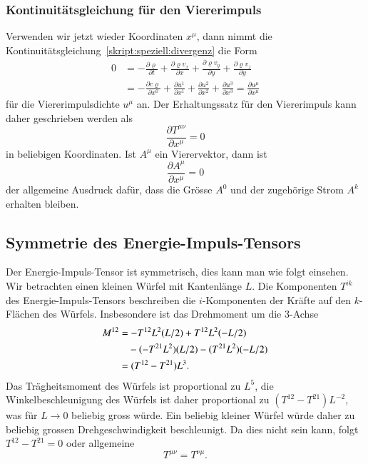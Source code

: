 \subsubsection{Kontinuitätsgleichung für den Viererimpuls}
Verwenden wir jetzt wieder Koordinaten $x^\mu$, dann nimmt die
Kontinuitätsgleichung~\eqref{skript:speziell:divergenz}
die Form
\begin{align*}
0
&=
-
\frac{\partial \varrho}{\partial t}
+
\frac{\partial \varrho v_x}{\partial x}
+
\frac{\partial \varrho v_y}{\partial y}
+
\frac{\partial \varrho v_z}{\partial y}
\\
&=
-\frac{\partial c \varrho}{\partial x^0}
+\frac{\partial u^1}{\partial x^1}
+\frac{\partial u^2}{\partial x^2}
+\frac{\partial u^3}{\partial x^3}
=
\frac{\partial u^\mu}{\partial x^\mu}
\end{align*}
für die Viererimpulsdichte $u^\mu$ an.
%
%
Der Erhaltungssatz für den Viererimpuls kann daher
geschrieben werden als
\begin{equation}
\frac{\partial T^{\mu\nu}}{\partial x^\mu}
=0
\label{skript:speziell:energieerhaltung}
\end{equation}
in beliebigen Koordinaten.
Ist $A^{\mu}$ ein Vierervektor, dann ist
\[
\frac{\partial A^\mu}{\partial x^\mu}=0
\]
der allgemeine Ausdruck dafür, dass die Grösse $A^0$ und der zugehörige
Strom $A^k$ erhalten bleiben.

\subsection{Symmetrie des Energie-Impuls-Tensors}
%
Der Energie-Impuls-Tensor ist symmetrisch, dies kann man wie folgt einsehen.
Wir betrachten einen kleinen Würfel mit Kantenlänge $L$.
Die Komponenten $T^{ik}$ des Energie-Impuls-Tensors beschreiben die
$i$-Komponenten der Kräfte auf den $k$-Flächen des Würfels.
Insbesondere ist das Drehmoment um die $3$-Achse
\begin{align*}
M^{12}
&=
-T^{12}L^2(L/2) + T^{12}L^2 (-L/2)
\\
&\phantom{\mathstrut=}-(-T^{21}L^2)(L/2)-(T^{21}L^2)(-L/2)
\\
&=(T^{12}-T^{21})L^3.
\end{align*}
Das Trägheitsmoment des Würfels ist proportional zu $L^5$,
die Winkelbeschleunigung des Würfels ist daher proportional
zu $(T^{12}-T^{21})L^{-2}$, was für $L\to 0$ beliebig gross würde.
Ein beliebig kleiner Würfel würde daher zu beliebig grossen 
Drehgeschwindigkeit beschleunigt.
Da dies nicht sein kann, folgt $T^{12}-T^{21}=0$ oder allgemeine
\[
T^{\mu\nu}=T^{\nu\mu}.
\]

